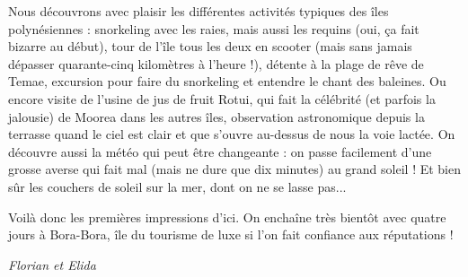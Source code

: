 Nous découvrons avec plaisir les différentes activités typiques des îles
polynésiennes : snorkeling avec les raies, mais aussi les requins (oui,
ça fait bizarre au début), tour de l'île tous les deux en scooter (mais
sans jamais dépasser quarante-cinq kilomètres à l'heure !), détente à la
plage de rêve de Temae, excursion pour faire du snorkeling et entendre
le chant des baleines. Ou encore visite de l'usine de jus de fruit
Rotui, qui fait la célébrité (et parfois la jalousie) de Moorea dans les
autres îles, observation astronomique depuis la terrasse quand le ciel
est clair et que s'ouvre au-dessus de nous la voie lactée. On découvre
aussi la météo qui peut être changeante : on passe facilement d'une
grosse averse qui fait mal (mais ne dure que dix minutes) au grand
soleil ! Et bien sûr les couchers de soleil sur la mer, dont on ne se
lasse pas...

Voilà donc les premières impressions d'ici. On enchaîne très bientôt
avec quatre jours à Bora-Bora, île du tourisme de luxe si l'on fait
confiance aux réputations !

\emph{Florian et Elida}
